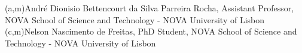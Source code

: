 %
%
%
%
(a,m){André Dionisio Bettencourt da Silva Parreira Rocha, Assistant Professor, NOVA School of Science and Technology - NOVA University of Lisbon}
(c,m){Nelson Nascimento de Freitas, PhD Student, NOVA School of Science and Technology - NOVA University of Lisbon}

%
%
%
%
